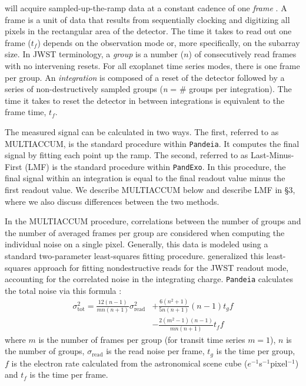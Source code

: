 \documentclass[iop]{emulateapj}
\begin{document}
will acquire sampled-up-the-ramp data at a constant cadence of one \emph{frame} \citep{rau07}.
A frame is a unit of data that results from sequentially clocking and
digitizing all pixels in the rectangular area of the detector. The time it takes to
read out one frame ($t_f$) depends on the observation mode or, more specifically, on the
subarray size. In JWST terminology, a \emph{group} is a number ($n$) of consecutively
read frames with no intervening resets. For all exoplanet time series
modes, there is one frame per group. An \emph{integration}
is composed of a reset of the detector followed by a series of non-destructively sampled
groups (\emph{n} = \# groups per integration). The time it takes to reset the
detector in between integrations is equivalent to the frame time, $t_f$. 

The measured signal can be calculated in two ways. The first, referred to as MULTIACCUM, is the standard procedure within \texttt{Pandeia}. It computes the final signal by fitting each point up the ramp. The second, referred to as Last-Minus-First (LMF) is the standard procedure within \texttt{PandExo}. In this procedure, the final signal
within an integration is equal to the final readout value minus the 
first readout value. We describe MULTIACCUM below and describe LMF in \S3, where we also discuss differences between the two methods. 

In the MULTIACCUM procedure, correlations between the number
of groups and the number of averaged frames per group are considered when computing the individual noise on a single pixel. Generally, this data is modeled using a standard two-parameter least-squares fitting procedure. \citet{rau07} generalized this least-squares approach for fitting nondestructive reads for the JWST readout mode, accounting for the correlated noise in the integrating charge. \texttt{Pandeia} calculates the total noise via this formula \citep{rau07}: 
\begin{equation}
\begin{split}
        \sigma^2_\textrm{tot}  =  \frac{12(n-1)}{mn(n+1)}\sigma_\textrm{read}^2  &+\frac{6(n^2 +1)}{5n(n+1)}(n-1)t_gf   \\ & -  \frac{2(m^2-1)(n-1)}{mn(n+1)}t_ff 
\end{split}
\end{equation}
where $m$ is the number of frames per group (for transit time series $m=1$), 
$n$ is the number of groups, $\sigma_\textrm{read}$ is the read noise per frame, 
$t_g$ is the time per group, $f$ is the electron rate calculated from the 
astronomical scene cube ($e^{-1}$s$^{-1}$pixel$^{-1}$) and $t_f$ is the time per frame. 
\end{document}
